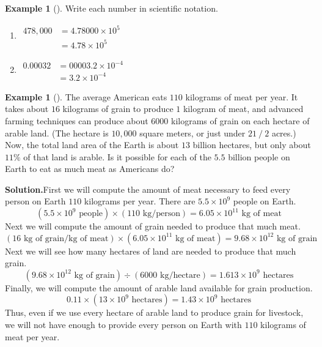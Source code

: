 \documentclass[10pt,]{book}
\theoremstyle{plain}
\theoremstyle{definition}
\theoremstyle{definition}
\newtheorem{example}[theorem]{Example}
\theoremstyle{definition}
\numberwithin{equation}{part}
\newcommand{\amp}{&}
\begin{document}
\begin{example}[]\label{example-8}
Write each number in scientific notation. \leavevmode%
\begin{enumerate}[label=*\alph**]
\item\hypertarget{li-107}{}\(\begin{aligned}
478,000 \amp = 4.78000 \times 10^5\\
\amp = 4.78 \times 10^5
\end{aligned}\)%
\item\hypertarget{li-108}{}\(\begin{aligned}
0.00032 \amp= 00003.2 \times 10^{−4}\\
\amp = 3.2 \times 10^{-4}
\end{aligned}\)%
\end{enumerate}
%
\end{example}
\begin{example}[]\label{example-9}
The average American eats \(110\) kilograms of meat per year. It takes about \(16\) kilograms of grain to produce \(1\) kilogram of meat, and advanced farming techniques can produce about \(6000\) kilograms of grain on each hectare of arable land. (The hectare is \(10,000\) square meters, or just under \(2 1⁄2\) acres.) Now, the total land area of the Earth is about \(13\) billion hectares, but only about \(11\%\) of that land is arable. Is it possible for each of the \(5.5\) billion people on Earth to eat as much meat as Americans do?%
\par\medskip\noindent%
\textbf{Solution.}\quad First we will compute the amount of meat necessary to feed every person on Earth \(110\) kilograms per year. There are \(5.5 \times 10^9\) people on Earth.%
\begin{equation*}
(5.5\times 10^9 \text{ people})\times (110 \text{ kg/person}) = 6.05\times 10^{11} \text{ kg of meat}
\end{equation*}
Next we will compute the amount of grain needed to produce that much meat.%
\begin{equation*}
(16 \text{ kg of grain/kg of meat})\times (6.05\times 10^{11} \text{ kg of meat}) = 9.68\times 10^{12} \text{ kg of grain}
\end{equation*}
Next we will see how many hectares of land are needed to produce that much grain.%
\begin{equation*}
(9.68\times 10^{12} \text{ kg of grain})\div(6000 \text{ kg/hectare}) = 1.613\times 10^9 \text{ hectares}
\end{equation*}
Finally, we will compute the amount of arable land available for grain production.%
\begin{equation*}
0.11\times (13\times 10^9 \text{ hectares}) = 1.43\times 10^9 \text{ hectares}
\end{equation*}
Thus, even if we use every hectare of arable land to produce grain for livestock, we will not have enough to provide every person on Earth with \(110\) kilograms of meat per year.%
\end{example}
\typeout{************************************************}
\typeout{************************************************}
\end{document}
